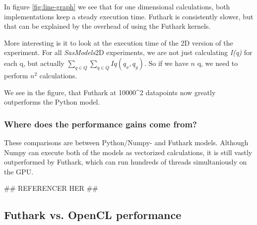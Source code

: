 \documentclass[11pt]{article}
\newcommand{\sasmodels}{\textit{SasModels}}
\newcommand{\iq}{\textit{I(q)}}
\begin{document}
In figure \ref{fig:line-graph} we see that for one dimensional calculations,
both implementations keep a steady execution time. Futhark is consistently 
slower, but that can be explained by the overhead of using the Futhark kernels.

More interesting is it to look at the execution time of the 2D version of the 
experiment. For all \sasmodels 2D experiments, we are not just calculating \iq
for each q, but actually $\sum_{q \in Q} \sum_{q \in Q} Iq(q_x, q_y)$.
So if we have $n$ q, we need to perform $n^2$ calculations.

We see in the figure, that Futhark at 10000^2 datapoints now greatly outperforms
the Python model.
\subsubsection{Where does the performance gains come from?}
These comparisons are between Python/Numpy- and Futhark models.
Although Numpy can execute both of the models as vectorized calculations, 
it is still vastly outperformed by Futhark, which can run hundreds of threads 
simultaniously on the GPU.

## REFERENCER HER ##

\subsection{Futhark vs. OpenCL performance}
\end{document}
